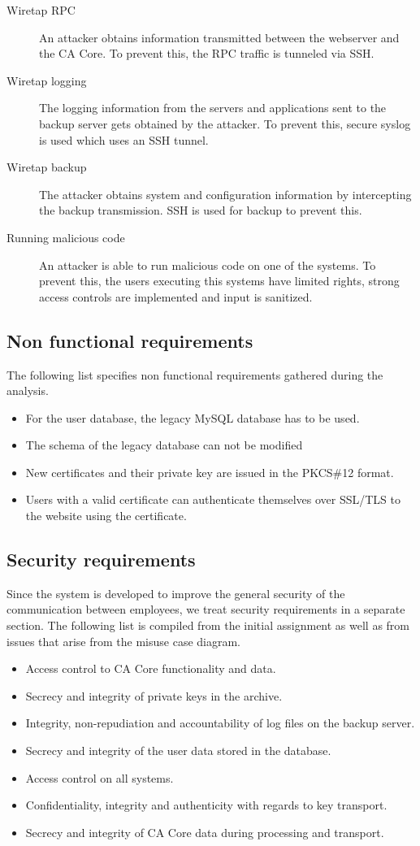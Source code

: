 \documentclass[a4paper, toc=index, 12pt, DIV14, twoside, BCOR2cm, headsepline, numbers=noenddot, bibliography=totoc]{report}
\begin{document}
\begin{description}
\item[Wiretap RPC ] An attacker obtains information transmitted between the webserver and the CA Core. To prevent this, the RPC traffic is tunneled via SSH.
\item[Wiretap logging ] The logging information from the servers and applications sent to the backup server gets obtained by the attacker. To prevent this, secure syslog is used which uses an SSH tunnel.
\item[Wiretap backup ] The attacker obtains system and configuration information by intercepting the backup transmission. SSH is used for backup to prevent this.
\item[Running malicious code ] An attacker is able to run malicious code on one of the systems. To prevent this, the users executing this systems have limited rights, strong access controls are implemented and input is sanitized.
\end{description}

\subsection{Non functional requirements}
The following list specifies non functional requirements gathered during the analysis.
\begin{itemize}
\item For the user database, the legacy MySQL database has to be used.
\item The schema of the legacy database can not be modified
\item New certificates and their private key are issued in the PKCS\#12 format.
\item Users with a valid certificate can authenticate themselves over SSL/TLS to the website using the certificate.
\end{itemize}

\subsection{Security requirements}
Since the system is developed to improve the general security of the communication between employees, we treat security requirements in a separate section. The following list is compiled from the initial assignment as well as from issues that arise from the misuse case diagram.
\begin{itemize}
\item Access control to CA Core functionality and data.
\item Secrecy and integrity of private keys in the archive.
\item Integrity, non-repudiation and accountability of log files on the backup server.
\item Secrecy and integrity of the user data stored in the database.
\item Access control on all systems.
\item Confidentiality, integrity and authenticity with regards to key transport.
\item Secrecy and integrity of CA Core data during processing and transport.
\end{itemize}
\end{document}

